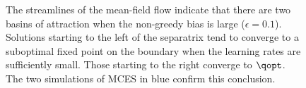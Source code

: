 \begin{figure}[htbp]
    \caption{The streamlines of the mean-field flow indicate that there are two basins of attraction when the non-greedy bias is large ($\epsilon = 0.1$).
    Solutions starting to the left of the separatrix tend to converge to a suboptimal fixed point on the boundary when the learning rates are sufficiently small.
    Those starting to the right converge to $\qopt$. The two simulations of MCES in blue confirm this conclusion.}
    \label{fig: experiment for off-policy bias}
        \label{fig: experiment for off-policy bias large}
\end{figure}